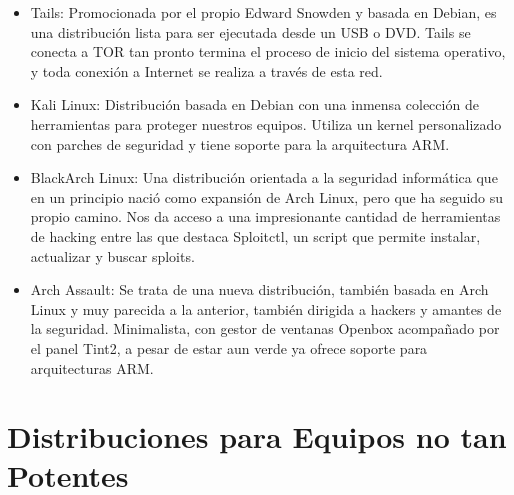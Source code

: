 \documentclass[11pt, a4paper]{report}
\begin{document}
\begin{itemize}
\item Tails: Promocionada por el propio Edward Snowden y basada en Debian, es
  una distribución lista para ser ejecutada desde un USB o DVD. Tails se
  conecta a TOR tan pronto termina el proceso de inicio del sistema operativo,
  y toda conexión a Internet se realiza a través de esta red.
\item Kali Linux: Distribución basada en Debian con una inmensa colección de
  herramientas para proteger nuestros equipos. Utiliza un kernel personalizado
  con parches de seguridad y tiene soporte para la arquitectura ARM.
\item BlackArch Linux: Una distribución orientada a la seguridad informática
  que en un principio nació como expansión de Arch Linux, pero que ha seguido
  su propio camino. Nos da acceso a una impresionante cantidad de herramientas
  de hacking entre las que destaca Sploitctl, un script que permite instalar,
  actualizar y buscar sploits.
\item Arch Assault: Se trata de una nueva distribución, también basada en Arch
  Linux y muy parecida a la anterior, también dirigida a hackers y amantes de
  la seguridad. Minimalista, con gestor de ventanas Openbox acompañado por el
  panel Tint2, a pesar de estar aun verde ya ofrece soporte para arquitecturas
  ARM.
\end{itemize}

\section*{Distribuciones para Equipos no tan Potentes}
\end{document}

